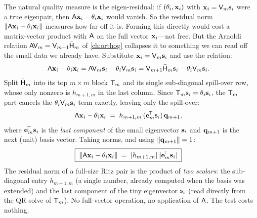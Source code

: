 The natural quality measure is the eigen-residual: if $(\theta_i, \mathbf{x}_i)$ with
$\mathbf{x}_i = \mathsf{V}_m\mathbf{s}_i$ were a true eigenpair, then $\mathsf{A}\mathbf{x}_i - \theta_i\mathbf{x}_i$ would
vanish. So the residual norm $\lVert\mathsf{A}\mathbf{x}_i - \theta_i\mathbf{x}_i\rVert$ measures how far off it
is. Forming this directly would cost a matrix-vector product with $\mathsf{A}$ on the full
vector $\mathbf{x}_i$---not free. But the Arnoldi relation $\mathsf{A}\mathsf{V}_m = \mathsf{V}_{m+1}
\bar{\mathsf{H}}_m$ of \cref{ch:orthog} collapses it to something we can read off the small
data we already have. Substitute $\mathbf{x}_i = \mathsf{V}_m\mathbf{s}_i$ and use the relation:
\[
  \mathsf{A}\mathbf{x}_i - \theta_i\mathbf{x}_i
    = \mathsf{A}\mathsf{V}_m\mathbf{s}_i - \theta_i\mathsf{V}_m\mathbf{s}_i
    = \mathsf{V}_{m+1}\bar{\mathsf{H}}_m\mathbf{s}_i - \theta_i\mathsf{V}_m\mathbf{s}_i.
\]
Split $\bar{\mathsf{H}}_m$ into its top $m\times m$ block $\mathsf{T}_m$ and its single
sub-diagonal spill-over row, whose only nonzero is $h_{m+1,m}$ in the last column. Since
$\mathsf{T}_m\mathbf{s}_i = \theta_i\mathbf{s}_i$, the $\mathsf{T}_m$ part cancels the $\theta_i\mathsf{V}_m\mathbf{s}_i$
term exactly, leaving only the spill-over:
\[
  \mathsf{A}\mathbf{x}_i - \theta_i\mathbf{x}_i \;=\; h_{m+1,m}\,(\mathbf{e}_m^{\!\top}\mathbf{s}_i)\,\mathbf{q}_{m+1},
\]
where $\mathbf{e}_m^{\!\top}\mathbf{s}_i$ is the \emph{last component} of the small eigenvector $\mathbf{s}_i$
and $\mathbf{q}_{m+1}$ is the next (unit) basis vector. Taking norms, and using
$\lVert\mathbf{q}_{m+1}\rVert = 1$:
\[
  \boxed{\;\lVert\mathsf{A}\mathbf{x}_i - \theta_i\mathbf{x}_i\rVert
    \;=\; \lvert h_{m+1,m}\rvert\;\lvert\mathbf{e}_m^{\!\top}\mathbf{s}_i\rvert\;}
\]
The residual norm of a full-size Ritz pair is the product of \emph{two scalars}: the
sub-diagonal entry $h_{m+1,m}$ (a single number, already computed when the basis was
extended) and the last component of the tiny eigenvector $\mathbf{s}_i$ (read directly from the
QR solve of $\mathsf{T}_m$). No full-vector operation, no application of $\mathsf{A}$. The test
costs nothing.

